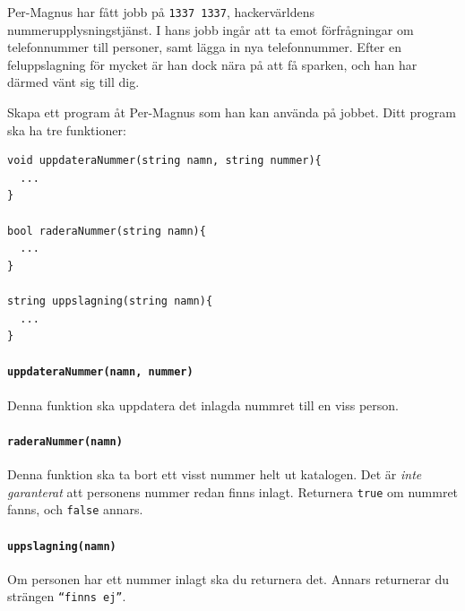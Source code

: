 
Per-Magnus har fått jobb på \texttt{1337 1337}, hackervärldens nummerupplysningstjänst. I hans jobb ingår att ta emot förfrågningar om telefonnummer till personer, samt lägga in nya telefonnummer. Efter en feluppslagning för mycket är han dock nära på att få sparken, och han har därmed vänt sig till dig.

Skapa ett program åt Per-Magnus som han kan använda på jobbet. Ditt program ska ha tre funktioner:

\begin{verbatim}
void uppdateraNummer(string namn, string nummer){
  ...
}

bool raderaNummer(string namn){
  ...
}

string uppslagning(string namn){
  ...
}
\end{verbatim}

\paragraph*{\texttt{uppdateraNummer(namn, nummer)}} Denna funktion ska uppdatera det inlagda nummret till en viss person.

\paragraph*{\texttt{raderaNummer(namn)}} Denna funktion ska ta bort ett visst nummer helt ut katalogen. Det är \emph{inte garanterat} att personens nummer redan finns inlagt. Returnera \texttt{true} om nummret fanns, och \texttt{false} annars.

\paragraph*{\texttt{uppslagning(namn)}}  Om personen har ett nummer inlagt ska du returnera det. Annars returnerar du strängen \texttt{``finns ej''}.
